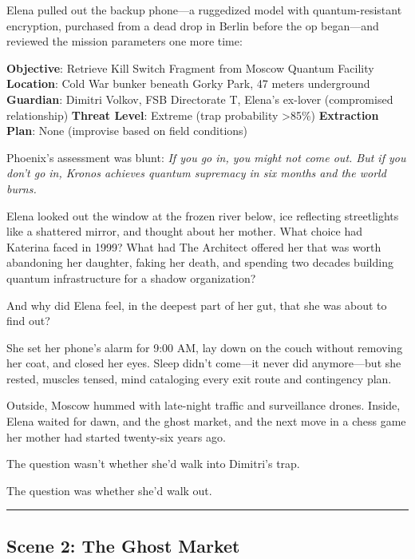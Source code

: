 Elena pulled out the backup phone---a ruggedized model with quantum-resistant encryption, purchased from a dead drop in Berlin before the op began---and reviewed the mission parameters one more time:

\textbf{Objective}: Retrieve Kill Switch Fragment from Moscow Quantum Facility \textbf{Location}: Cold War bunker beneath Gorky Park, 47 meters underground \textbf{Guardian}: Dimitri Volkov, FSB Directorate T, Elena's ex-lover (compromised relationship) \textbf{Threat Level}: Extreme (trap probability \textgreater85\%) \textbf{Extraction Plan}: None (improvise based on field conditions)

Phoenix's assessment was blunt: \emph{If you go in, you might not come out. But if you don't go in, Kronos achieves quantum supremacy in six months and the world burns.}

Elena looked out the window at the frozen river below, ice reflecting streetlights like a shattered mirror, and thought about her mother. What choice had Katerina faced in 1999? What had The Architect offered her that was worth abandoning her daughter, faking her death, and spending two decades building quantum infrastructure for a shadow organization?

And why did Elena feel, in the deepest part of her gut, that she was about to find out?

She set her phone's alarm for 9:00 AM, lay down on the couch without removing her coat, and closed her eyes. Sleep didn't come---it never did anymore---but she rested, muscles tensed, mind cataloging every exit route and contingency plan.

Outside, Moscow hummed with late-night traffic and surveillance drones. Inside, Elena waited for dawn, and the ghost market, and the next move in a chess game her mother had started twenty-six years ago.

The question wasn't whether she'd walk into Dimitri's trap.

The question was whether she'd walk out.

\begin{center}\rule{0.5\linewidth}{0.5pt}\end{center}

\hypertarget{scene-2-the-ghost-market}{%
\subsection{Scene 2: The Ghost Market}\label{scene-2-the-ghost-market}}


